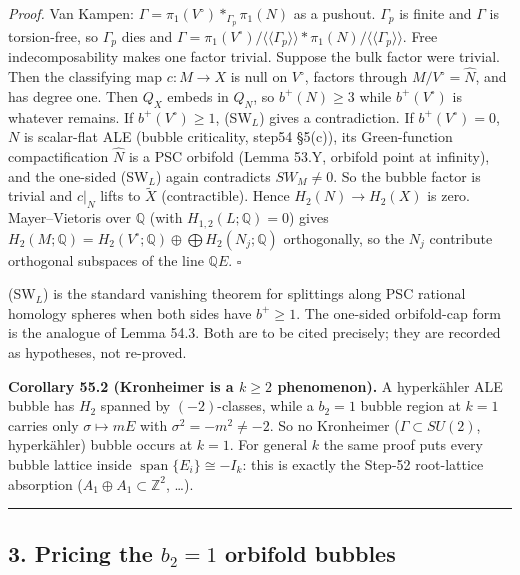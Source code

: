 \documentclass[
  10pt,
]{report}
\begin{document}
\emph{Proof.} Van Kampen: \(\Gamma=\pi_1(V^\circ)*_{\Gamma_p}\pi_1(N)\)
as a pushout. \(\Gamma_p\) is finite and \(\Gamma\) is torsion-free, so
\(\Gamma_p\) dies and
\(\Gamma=\pi_1(V^\circ)/\langle\!\langle\Gamma_p\rangle\!\rangle*\pi_1(N)/\langle\!\langle\Gamma_p\rangle\!\rangle\).
Free indecomposability makes one factor trivial. Suppose the bulk factor
were trivial. Then the classifying map \(c:M\to X\) is null on
\(V^\circ\), factors through \(M/V^\circ=\widehat N\), and has degree
one. Then \(Q_X\) embeds in \(Q_N\), so \(b^+(N)\ge3\) while
\(b^+(V^\circ)\) is whatever remains. If \(b^+(V^\circ)\ge1\),
(SW\(_L\)) gives a contradiction. If \(b^+(V^\circ)=0\), \(N\) is
scalar-flat ALE (bubble criticality, step54 §5(c)), its Green-function
compactification \(\widehat N\) is a PSC orbifold (Lemma 53.Y, orbifold
point at infinity), and the one-sided (SW\(_L\)) again contradicts
\(SW_M\ne0\). So the bubble factor is trivial and \(c|_N\) lifts to
\(\widetilde X\) (contractible). Hence \(H_2(N)\to H_2(X)\) is zero.
Mayer--Vietoris over \(\mathbb Q\) (with \(H_{1,2}(L;\mathbb Q)=0\))
gives
\(H_2(M;\mathbb Q)=H_2(V^\circ;\mathbb Q)\oplus\bigoplus H_2(N_j;\mathbb Q)\)
orthogonally, so the \(N_j\) contribute orthogonal subspaces of the line
\(\mathbb QE\). \(\square\)

(SW\(_L\)) is the standard vanishing theorem for splittings along PSC
rational homology spheres when both sides have \(b^+\ge1\). The
one-sided orbifold-cap form is the analogue of Lemma 54.3. Both are to
be cited precisely; they are recorded as hypotheses, not re-proved.

\textbf{Corollary 55.2 (Kronheimer is a \(k\ge2\) phenomenon).} A
hyperkähler ALE bubble has \(H_2\) spanned by \((-2)\)-classes, while a
\(b_2=1\) bubble region at \(k=1\) carries only \(\sigma\mapsto mE\)
with \(\sigma^2=-m^2\neq-2\). So no Kronheimer (\(\Gamma\subset SU(2)\),
hyperkähler) bubble occurs at \(k=1\). For general \(k\) the same proof
puts every bubble lattice inside
\(\operatorname{span}\{E_i\}\cong-I_k\): this is exactly the Step-52
root-lattice absorption (\(A_1\oplus A_1\subset\mathbb Z^2\), \ldots).

\begin{center}\rule{0.5\linewidth}{0.5pt}\end{center}

\hypertarget{pricing-the-b_21-orbifold-bubbles}{%
\subsection{\texorpdfstring{3. Pricing the \(b_2=1\) orbifold
bubbles}{3. Pricing the b\_2=1 orbifold bubbles}}\label{pricing-the-b_21-orbifold-bubbles}}
\end{document}
